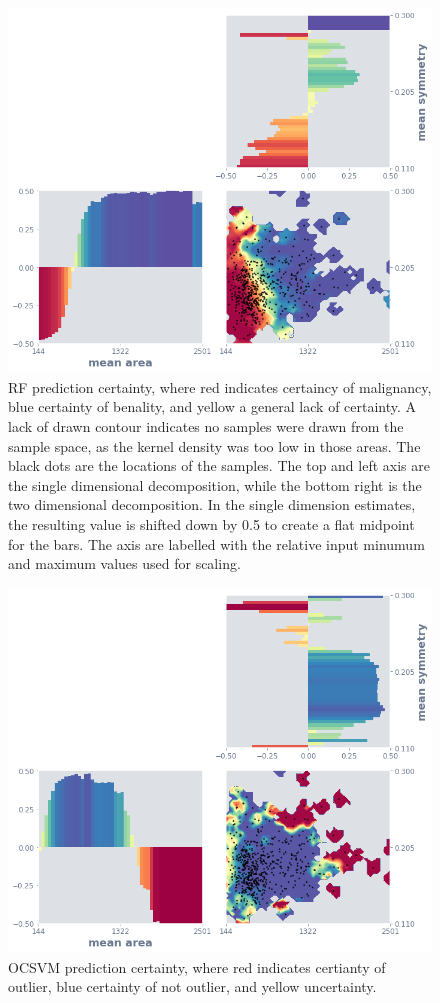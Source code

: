 \documentclass[a4paper, twocolumn]{article}
\begin{document}
\begin{figure}
\centering
\includegraphics[width=0.8\columnwidth]{img/interp_rf.png}
\caption{RF prediction certainty, where red indicates certaincy of malignancy, blue certainty of benality, and yellow a general lack of certainty. A lack of drawn contour indicates no samples were drawn from the sample space, as the kernel density was too low in those areas. The black dots are the locations of the samples. The top and left axis are the single dimensional decomposition, while the bottom right is the two dimensional decomposition. In the single dimension estimates, the resulting value is shifted down by 0.5 to create a flat midpoint for the bars. The axis are labelled with the relative input minumum and maximum values used for scaling.}
\label{fig:interp-rf}
\end{figure}

\begin{figure}
\centering
\includegraphics[width=0.8\columnwidth]{img/interp_ocsvm.png}
\caption{OCSVM prediction certainty, where red indicates certianty of outlier, blue certainty of not outlier, and yellow uncertainty.}
\label{fig:interp-ocsvm}
\end{figure}
\end{document}
